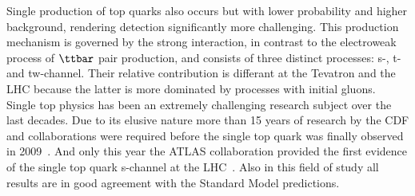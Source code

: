 Single production of top quarks also occurs but with lower probability and higher background, rendering detection significantly more challenging.
This production mechanism is governed by the strong interaction, in contrast to the electroweak process of $\ttbar$ pair production, and consists of three distinct processes: s-, t- and tw-channel.
Their relative contribution is differant at the Tevatron and the LHC because the latter is more dominated by processes with initial gluons. %
\\
Single top physics has been an extremely challenging research subject over the last decades. Due to its elusive nature more than 15 years of research by the CDF and \DZ collaborations were required before the single top quark was finally observed in 2009~\cite{STDiscovery1, STDiscovery2}. And only this year the ATLAS collaboration provided the first evidence of the single top quark s-channel at the LHC~\cite{AtlasSTsChEvidence}. Also in this field of study all results are in good agreement with the Standard Model predictions.
